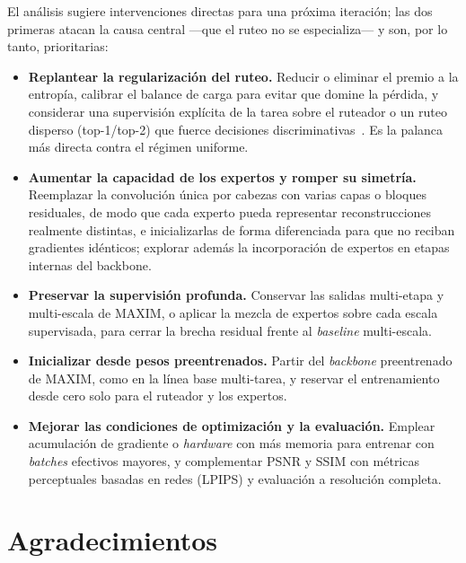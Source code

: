 \documentclass[aps,prl,twocolumn,groupedaddress]{revtex4-2}
\begin{document}
El análisis sugiere intervenciones directas para una próxima iteración; las dos primeras atacan la causa central ---que el ruteo no se especializa--- y son, por lo tanto, prioritarias:
\begin{itemize}
    \item \textbf{Replantear la regularización del ruteo.} Reducir o eliminar el premio a la entropía, calibrar el balance de carga para evitar que domine la pérdida, y considerar una supervisión explícita de la tarea sobre el ruteador o un ruteo disperso (top-1/top-2) que fuerce decisiones discriminativas~\cite{shazeer2017moe,fedus2022switch}. Es la palanca más directa contra el régimen uniforme.
    \item \textbf{Aumentar la capacidad de los expertos y romper su simetría.} Reemplazar la convolución única por cabezas con varias capas o bloques residuales, de modo que cada experto pueda representar reconstrucciones realmente distintas, e inicializarlas de forma diferenciada para que no reciban gradientes idénticos; explorar además la incorporación de expertos en etapas internas del backbone.
    \item \textbf{Preservar la supervisión profunda.} Conservar las salidas multi-etapa y multi-escala de MAXIM, o aplicar la mezcla de expertos sobre cada escala supervisada, para cerrar la brecha residual frente al \textit{baseline} multi-escala.
    \item \textbf{Inicializar desde pesos preentrenados.} Partir del \textit{backbone} preentrenado de MAXIM, como en la línea base multi-tarea, y reservar el entrenamiento desde cero solo para el ruteador y los expertos.
    \item \textbf{Mejorar las condiciones de optimización y la evaluación.} Emplear acumulación de gradiente o \textit{hardware} con más memoria para entrenar con \textit{batches} efectivos mayores, y complementar PSNR y SSIM con métricas perceptuales basadas en redes (LPIPS) y evaluación a resolución completa.
\end{itemize}

\section{Agradecimientos}

\begin{acknowledgments}
\end{acknowledgments}
% 
\end{document}
